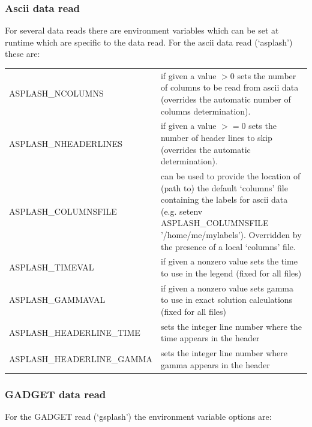 \documentclass[a4paper,10pt]{article}
\begin{document}
\subsubsection{ Ascii data read}
\label{sec:asplash}
 For several data reads there are environment variables which can be set at runtime which are specific to the data read. For the
 ascii data read (`asplash') these are:\newline

\begin{tabular}{p{}p{}}
ASPLASH\_NCOLUMNS & if given a value $>$0 sets the number of columns to be read from ascii data (overrides the automatic number of
columns determination). \\
ASPLASH\_NHEADERLINES & if given a value $>=$0 sets the number of header lines to skip (overrides the automatic determination). \\
ASPLASH\_COLUMNSFILE & can be used to provide the location of (path to) the default `columns' file containing the labels for ascii data (e.g. setenv ASPLASH\_COLUMNSFILE '/home/me/mylabels'). Overridden by the presence of a local `columns' file. \\
ASPLASH\_TIMEVAL & if given a nonzero value sets the time to use in the legend (fixed for all files) \\
ASPLASH\_GAMMAVAL & if given a nonzero value sets gamma to use in exact solution calculations (fixed for all files) \\
ASPLASH\_HEADERLINE\_TIME & sets the integer line number where the time appears in the header \\
ASPLASH\_HEADERLINE\_GAMMA & sets the integer line number where gamma appears in the header \\
\end{tabular}

\subsubsection{ GADGET data read}
\label{sec:gsplash}
 For the GADGET read (`gsplash') the environment variable options are:\newline
\end{document}
